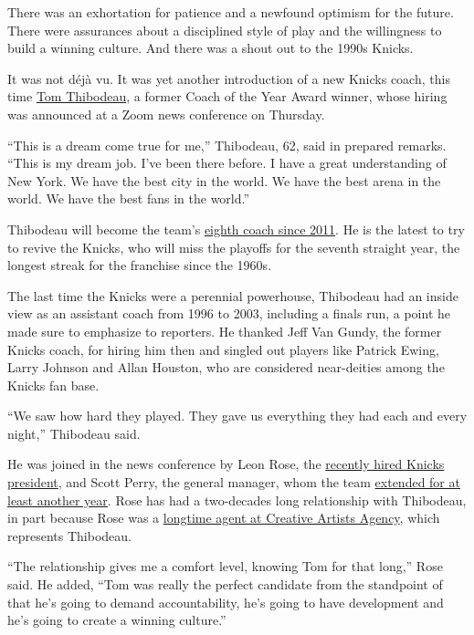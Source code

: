 There was an exhortation for patience and a newfound optimism for the
future. There were assurances about a disciplined style of play and the
willingness to build a winning culture. And there was a shout out to the
1990s Knicks.

It was not déjà vu. It was yet another introduction of a new Knicks
coach, this time
\href{https://www.nytimes3xbfgragh.onion/2020/07/25/sports/tom-thibodeau-nearing-agreement-to-become-knicks-coach.html}{Tom
Thibodeau}, a former Coach of the Year Award winner, whose hiring was
announced at a Zoom news conference on Thursday.

``This is a dream come true for me,'' Thibodeau, 62, said in prepared
remarks. ``This is my dream job. I've been there before. I have a great
understanding of New York. We have the best city in the world. We have
the best arena in the world. We have the best fans in the world.''

Thibodeau will become the team's
\href{https://www.basketball-reference.com/teams/NYK/}{eighth coach
since 2011}. He is the latest to try to revive the Knicks, who will miss
the playoffs for the seventh straight year, the longest streak for the
franchise since the 1960s.

The last time the Knicks were a perennial powerhouse, Thibodeau had an
inside view as an assistant coach from 1996 to 2003, including a finals
run, a point he made sure to emphasize to reporters. He thanked Jeff Van
Gundy, the former Knicks coach, for hiring him then and singled out
players like Patrick Ewing, Larry Johnson and Allan Houston, who are
considered near-deities among the Knicks fan base.

``We saw how hard they played. They gave us everything they had each and
every night,'' Thibodeau said.

He was joined in the news conference by Leon Rose, the
\href{https://www.nytimes3xbfgragh.onion/2020/02/06/sports/basketball/leon-rose-knicks-president.html}{recently
hired Knicks president}, and Scott Perry, the general manager, whom the
team
\href{https://www.nytimes3xbfgragh.onion/2020/04/29/sports/basketball/scott-perry-knicks.html}{extended
for at least another year}. Rose has had a two-decades long relationship
with Thibodeau, in part because Rose was a
\href{https://www.nytimes3xbfgragh.onion/2020/06/24/sports/basketball/knicks-world-wide-wes.html}{longtime
agent at Creative Artists Agency}, which represents Thibodeau.

``The relationship gives me a comfort level, knowing Tom for that
long,'' Rose said. He added, ``Tom was really the perfect candidate from
the standpoint of that he's going to demand accountability, he's going
to have development and he's going to create a winning culture.''

